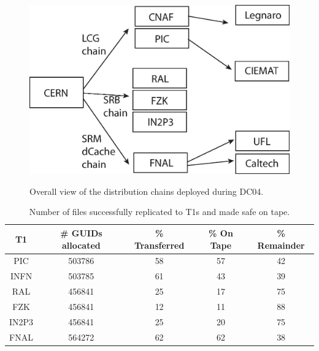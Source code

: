 \documentclass{cmspaper}
\begin{document}
\begin{figure}[tbp]
\centering
\includegraphics[width=15cm, angle = 90]{chains.eps}
\label{fig:chains}
\caption{Overall view of the distribution chains deployed during DC04.}
\end{figure}
\clearpage
\centering
\begin{table}
\begin{tabular}[tbp]{|c|c|c|c|c|}
\hline T1 & \# GUIDs allocated & \% Transferred & \% On Tape & \% Remainder
\\ \hline PIC	& 503786	& 58	& 57	& 42\\ INFN	& 503785	& 61	& 43	& 39
\\ RAL	& 456841	& 25	& 17	& 75
\\ FZK	& 456841	& 12	& 11	& 88
\\ IN2P3	& 456841	& 25	& 20	& 75
\\ FNAL	& 564272	& 62	& 62	& 38
\\ \hline
\end{tabular}
\label{table:migrated}
\caption{Number of files successfully replicated to T1s and made safe on tape.}
\end{table}\clearpage
\end{document}
